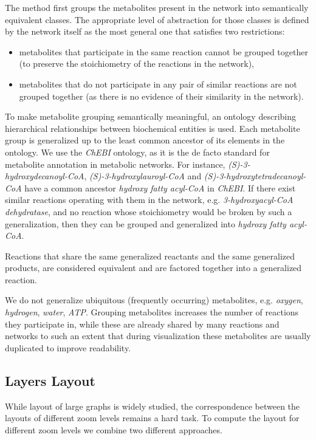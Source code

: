 \documentclass{bmcart}
\begin{document}
The method first groups the metabolites present in the network into semantically equivalent classes. The appropriate level of abstraction for those classes is defined by the network itself as the most general one that satisfies two restrictions: 
\begin{itemize}
 \item metabolites that participate in the same reaction cannot be grouped together (to preserve the stoichiometry of the reactions in the network),
 \item metabolites that do not participate in any pair of similar reactions are not grouped together (as there is no evidence of their similarity in the network).
\end{itemize}
To make metabolite grouping semantically meaningful, an ontology describing hierarchical relationships between biochemical entities is used. Each metabolite group is generalized up to the least common ancestor of its elements in the ontology. We use the \textit{ChEBI} ontology, as it is the de facto standard for metabolite annotation in metabolic networks. %
For instance, \textit{(S)-3-hydroxydecanoyl-CoA}, \textit{(S)-3-hydroxylauroyl-CoA} and \textit{(S)-3-hydroxytetradecanoyl-CoA} have a common ancestor \textit{hydroxy fatty acyl-CoA} in \textit{ChEBI}. If there exist similar reactions operating with them in the network, e.g. \textit{3-hydroxyacyl-CoA dehydratase}, and no reaction whose stoichiometry would be broken by such a generalization, then they can be grouped and generalized into \textit{hydroxy fatty acyl-CoA}.

Reactions that share the same generalized reactants and the same generalized products, are considered equivalent and are factored together into a generalized reaction. 

We do not generalize ubiquitous (frequently occurring) metabolites, e.g. \textit{oxygen}, \textit{hydrogen}, \textit{water}, \textit{ATP}. Grouping metabolites increases the number of reactions they participate in, while these are already shared by many reactions and networks to such an extent that during visualization these metabolites are usually duplicated\cite{Rohn2012} to improve readability.

\subsection*{Layers Layout}
While layout of large graphs is widely studied\cite{Unwin2006}, the correspondence between the layouts of different zoom levels remains a hard task. To compute the layout for different zoom levels we combine two different approaches.
\end{document}
